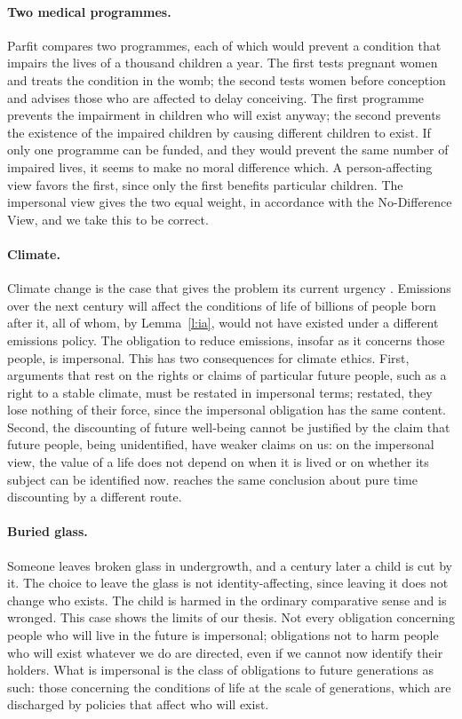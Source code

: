 \documentclass{situationist-preprint}
\begin{document}
\paragraph{Two medical programmes.} Parfit compares two programmes, each of which would prevent a condition that impairs the lives of a thousand children a year. The first tests pregnant women and treats the condition in the womb; the second tests women before conception and advises those who are affected to delay conceiving. The first programme prevents the impairment in children who will exist anyway; the second prevents the existence of the impaired children by causing different children to exist. If only one programme can be funded, and they would prevent the same number of impaired lives, it seems to make no moral difference which. A person-affecting view favors the first, since only the first benefits particular children. The impersonal view gives the two equal weight, in accordance with the No-Difference View, and we take this to be correct.

\paragraph{Climate.} Climate change is the case that gives the problem its current urgency \citep{Gardiner2011,Broome2012}. Emissions over the next century will affect the conditions of life of billions of people born after it, all of whom, by Lemma~\ref{l:ia}, would not have existed under a different emissions policy. The obligation to reduce emissions, insofar as it concerns those people, is impersonal. This has two consequences for climate ethics. First, arguments that rest on the rights or claims of particular future people, such as a right to a stable climate, must be restated in impersonal terms; restated, they lose nothing of their force, since the impersonal obligation has the same content. Second, the discounting of future well-being cannot be justified by the claim that future people, being unidentified, have weaker claims on us: on the impersonal view, the value of a life does not depend on when it is lived or on whether its subject can be identified now. \citet{Broome2012} reaches the same conclusion about pure time discounting by a different route.

\paragraph{Buried glass.} Someone leaves broken glass in undergrowth, and a century later a child is cut by it. The choice to leave the glass is not identity-affecting, since leaving it does not change who exists. The child is harmed in the ordinary comparative sense and is wronged. This case shows the limits of our thesis. Not every obligation concerning people who will live in the future is impersonal; obligations not to harm people who will exist whatever we do are directed, even if we cannot now identify their holders. What is impersonal is the class of obligations to future generations as such: those concerning the conditions of life at the scale of generations, which are discharged by policies that affect who will exist.
\end{document}
